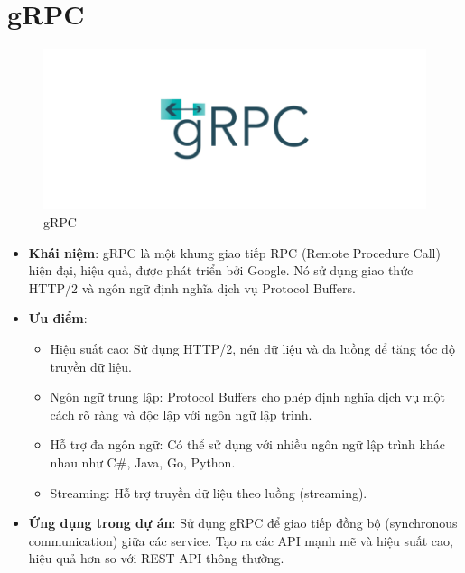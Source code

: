 \documentclass[../index.tex]{subfiles}
\begin{document}
    \section{gRPC}
    \begin{figure}[H]
        \centering
        \includegraphics[width=0.6\linewidth]{figures/tech-logo/grpc.png}
        \caption{gRPC}
    \end{figure}
    \begin{itemize}
        \item \textbf{Khái niệm}: gRPC là một khung giao tiếp RPC (Remote
            Procedure Call) hiện đại, hiệu quả, được phát triển bởi Google. Nó
            sử dụng giao thức HTTP/2 và ngôn ngữ định nghĩa dịch vụ Protocol
            Buffers.

        \item \textbf{Ưu điểm}:
            \begin{itemize}
                \item Hiệu suất cao: Sử dụng HTTP/2, nén dữ liệu và đa luồng để tăng
                    tốc độ truyền dữ liệu.

                \item Ngôn ngữ trung lập: Protocol Buffers cho phép định nghĩa
                    dịch vụ một cách rõ ràng và độc lập với ngôn ngữ lập trình.

                \item Hỗ trợ đa ngôn ngữ: Có thể sử dụng với nhiều ngôn ngữ lập
                    trình khác nhau như C\#, Java, Go, Python.

                \item Streaming: Hỗ trợ truyền dữ liệu theo luồng (streaming).
            \end{itemize}

        \item \textbf{Ứng dụng trong dự án}: Sử dụng gRPC để giao tiếp đồng bộ (synchronous
            communication) giữa các service. Tạo ra các API mạnh mẽ và hiệu suất
            cao, hiệu quả hơn so với REST API thông thường.
    \end{itemize}

\end{document}
